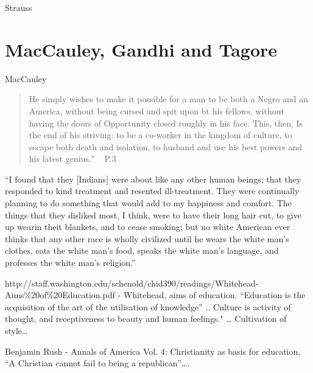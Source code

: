 Strauss

\section{MacCauley, Gandhi and Tagore}
\label{maccauleygandhiandtagore}

MacCauley

\begin{quote}

He simply wishes to make it possible for a man to be both a Negro and an America, without being cursed and spit upon bt his fellows, without having the doors of Opportunity closed roughly in his face.
This, then, Is the end of his striving: to be a co-worker in the kingdom of culture, to escape both death and isolation, to husband and use his best powers and his latest genius." ~\citep{DuBois:1994ui} P.3
\end{quote}

``I found that they [Indians] were about like any other human beings; that they responded to kind treatment and resented ill-treatment. They were continually planning to do something that would add to my happiness and comfort. The things that they disliked most, I think, were to have their long hair cut, to give up wearin theit blankets, and to cease smoking; but no white American ever thinks that any other race is wholly civilized until he wears the white man's clothes, eats the white man's food, speaks the white man's language, and professes the white man's religion.'' ~\citep[p. 57]{Washington:1952uf}

http:\slash \slash staff.washington.edu\slash schenold\slash chid390\slash readings\slash Whitehead-Aims\%20of\%20Education.pdf - Whitehead, aims of education. ``Education is the acquisition of the art of the utilisation of knowledge'' .. Culture is activity of thought, and receptiveness to beauty and human feelings." {\ldots} Cultivation of style{\ldots}

Benjamin Rush - Annals of America Vol. 4: Christianity as basis for education, ``A Christian cannot fail to being a republican''{\ldots}.

